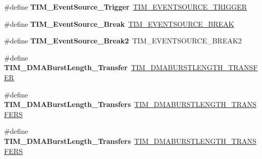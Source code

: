 \begin{DoxyCompactItemize}
\#define {\bfseries T\+I\+M\+\_\+\+Event\+Source\+\_\+\+Trigger}~\hyperlink{group___t_i_m___event___source_ga85573ed76442490db67e4b759fe6d901}{T\+I\+M\+\_\+\+E\+V\+E\+N\+T\+S\+O\+U\+R\+C\+E\+\_\+\+T\+R\+I\+G\+G\+ER}
\item 
\mbox{\label{group___h_a_l___t_i_m___aliased___defines_gad6f9b5366d93c73ff005273c50c9f00a}} 
\#define {\bfseries T\+I\+M\+\_\+\+Event\+Source\+\_\+\+Break}~\hyperlink{group___t_i_m___event___source_ga83d16368fe3172a98c41d7c414780a64}{T\+I\+M\+\_\+\+E\+V\+E\+N\+T\+S\+O\+U\+R\+C\+E\+\_\+\+B\+R\+E\+AK}
\item 
\mbox{\label{group___h_a_l___t_i_m___aliased___defines_ga18fcfb87d3361c3118e7251d5a99b92a}} 
\#define {\bfseries T\+I\+M\+\_\+\+Event\+Source\+\_\+\+Break2}~T\+I\+M\+\_\+\+E\+V\+E\+N\+T\+S\+O\+U\+R\+C\+E\+\_\+\+B\+R\+E\+A\+K2
\item 
\mbox{\label{group___h_a_l___t_i_m___aliased___defines_gab87f91f1c5583b9888cb6bb37fc639e2}} 
\#define {\bfseries T\+I\+M\+\_\+\+D\+M\+A\+Burst\+Length\+\_\+Transfer}~\hyperlink{group___t_i_m___d_m_a___burst___length_ga74f07b4a10022d71f31ec6e1b2b69276}{T\+I\+M\+\_\+\+D\+M\+A\+B\+U\+R\+S\+T\+L\+E\+N\+G\+T\+H\+\_\+T\+R\+A\+N\+S\+F\+ER}
\item 
\mbox{\label{group___h_a_l___t_i_m___aliased___defines_ga829504c3e8c90a9445f6a223bc3034f8}} 
\#define {\bfseries T\+I\+M\+\_\+\+D\+M\+A\+Burst\+Length\+\_\+Transfers}~\hyperlink{group___t_i_m___d_m_a___burst___length_gab114592091a00e0a6b9ae464485bd7bb}{T\+I\+M\+\_\+\+D\+M\+A\+B\+U\+R\+S\+T\+L\+E\+N\+G\+T\+H\+\_\+T\+R\+A\+N\+S\+F\+E\+RS}
\item 
\mbox{\label{group___h_a_l___t_i_m___aliased___defines_ga3a99863a0925e0cc9a11b91aade66f11}} 
\#define {\bfseries T\+I\+M\+\_\+\+D\+M\+A\+Burst\+Length\+\_\+Transfers}~\hyperlink{group___t_i_m___d_m_a___burst___length_gad91c14f0930803593ecdbd98002fea0a}{T\+I\+M\+\_\+\+D\+M\+A\+B\+U\+R\+S\+T\+L\+E\+N\+G\+T\+H\+\_\+T\+R\+A\+N\+S\+F\+E\+RS}
\item 
\mbox{\label{group___h_a_l___t_i_m___aliased___defines_ga84bfeb309593a1ac580e233bf7514b36}} 

\end{DoxyCompactItemize}
